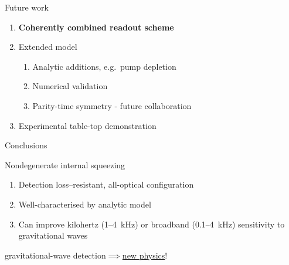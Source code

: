 \documentclass[12pt,xcolor=dvipsnames]{beamer}
\newcommand{\vframefill}{\vskip0pt plus 1filll}
\begin{document}

\begin{frame}{Future work}
	\begin{enumerate}
	\item \textbf{Coherently combined readout scheme} %
	\item Extended model %
		\begin{enumerate}
		\item Analytic additions, e.g.\ pump depletion
		\item Numerical validation %
		\item Parity-time symmetry - future collaboration
		\end{enumerate}
	\item Experimental table-top demonstration 
	\end{enumerate}
\end{frame}

\begin{frame}{Conclusions}
\begin{block}{Nondegenerate internal squeezing}
\begin{enumerate}
\item Detection loss--resistant, all-optical configuration
\item Well-characterised by analytic model
\item Can improve kilohertz (1--4~kHz) or broadband (0.1--4~kHz) sensitivity to gravitational waves 
\end{enumerate}
\end{block}
\vspace{0.5cm}
{
	\begin{block}{}
	\centering
	{\large gravitational-wave detection$\implies$\underline{new physics}!}
	\end{block}
}
\end{frame}
\end{document}
